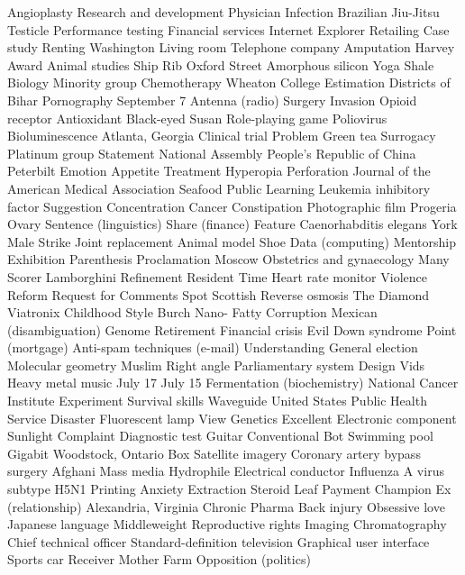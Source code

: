 Angioplasty  Research and development  Physician  
Infection  Brazilian Jiu-Jitsu  Testicle  
Performance testing  Financial services  Internet Explorer  
Retailing  Case study  Renting  
Washington  Living room  Telephone company  
Amputation  Harvey Award  Animal studies  
Ship  Rib  Oxford Street  
Amorphous silicon  Yoga  Shale  
Biology  Minority group  Chemotherapy  
Wheaton College  Estimation  Districts of Bihar  
Pornography  September 7  Antenna (radio)  
Surgery  Invasion  Opioid receptor  
Antioxidant  Black-eyed Susan  Role-playing game  
Poliovirus  Bioluminescence  Atlanta, Georgia  
Clinical trial  Problem  Green tea  
Surrogacy  Platinum group  Statement  
National Assembly  People's Republic of China  Peterbilt  
Emotion  Appetite  Treatment  
Hyperopia  Perforation  Journal of the American Medical Association  
Seafood  Public  Learning  
Leukemia inhibitory factor  Suggestion  Concentration  
Cancer  Constipation  Photographic film  
Progeria  Ovary  Sentence (linguistics)  
Share (finance)  Feature  Caenorhabditis elegans  
York  Male  Strike  
Joint replacement  Animal model  Shoe  
Data (computing)  Mentorship  Exhibition  
Parenthesis  Proclamation  Moscow  
Obstetrics and gynaecology  Many  Scorer  
Lamborghini  Refinement  Resident  
Time  Heart rate monitor  Violence  
Reform  Request for Comments  Spot  
Scottish  Reverse osmosis  The Diamond  
Viatronix  Childhood  Style  
Burch  Nano-  Fatty  
Corruption  Mexican (disambiguation)  Genome  
Retirement  Financial crisis  Evil  
Down syndrome  Point (mortgage)  Anti-spam techniques (e-mail)  
Understanding  General election  Molecular geometry  
Muslim  Right angle  Parliamentary system  
Design  Vids  Heavy metal music  
July 17  July 15  Fermentation (biochemistry)  
National Cancer Institute  Experiment  Survival skills  
Waveguide  United States Public Health Service  Disaster  
Fluorescent lamp  View  Genetics  
Excellent  Electronic component  Sunlight  
Complaint  Diagnostic test  Guitar  
Conventional  Bot  Swimming pool  
Gigabit  Woodstock, Ontario  Box  
Satellite imagery  Coronary artery bypass surgery  Afghani  
Mass media  Hydrophile  Electrical conductor  
Influenza A virus subtype H5N1  Printing  Anxiety  
Extraction  Steroid  Leaf  
Payment  Champion  Ex (relationship)  
Alexandria, Virginia  Chronic  Pharma  
Back injury  Obsessive love  Japanese language  
Middleweight  Reproductive rights  Imaging  
Chromatography  Chief technical officer  Standard-definition television  
Graphical user interface  Sports car  Receiver  
Mother  Farm  Opposition (politics)  
